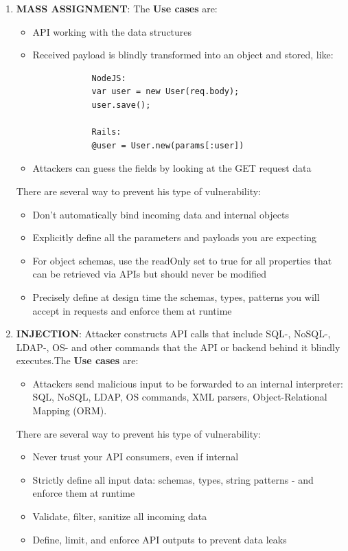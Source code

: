 \documentclass[10pt,a4paper]{report}
\begin{document}
\begin{enumerate}
\begin{itemize}
		\end{itemize}
	
	\item \textbf{MASS ASSIGNMENT}: The \textbf{Use cases} are:
	\begin{itemize}
		\item API working with the data structures
		\item Received payload is blindly transformed into an object and stored, like:
		\begin{lstlisting}
			NodeJS:
			var user = new User(req.body);
			user.save();
			
			Rails:
			@user = User.new(params[:user])
		\end{lstlisting}
		\item Attackers can guess the fields by looking at the GET request data
	\end{itemize}
	There are several way to prevent his type of vulnerability:
	\begin{itemize}
		\item Don’t automatically bind incoming data and internal objects
		\item Explicitly define all the parameters and payloads you are expecting
		\item For object schemas, use the readOnly set to true for all properties that
		can be retrieved via APIs but should never be modified
		\item Precisely define at design time the schemas, types, patterns you will
		accept in requests and enforce them at runtime
		
	\end{itemize}

		\item \textbf{INJECTION}: Attacker constructs API calls that include SQL-, NoSQL-, LDAP-, OS- and	other commands that the API or backend behind it blindly executes.The \textbf{Use cases} are:
	\begin{itemize}
		\item Attackers send malicious input to be forwarded to an internal
		interpreter: SQL, NoSQL, LDAP, OS commands, XML parsers, Object-Relational Mapping (ORM).

	\end{itemize}
	There are several way to prevent his type of vulnerability:
	\begin{itemize}
		\item Never trust your API consumers, even if internal
		\item Strictly define all input data: schemas, types, string patterns - and
		enforce them at runtime
		\item Validate, filter, sanitize all incoming data
		\item Define, limit, and enforce API outputs to prevent data leaks
		
	\end{itemize}
\end{enumerate}
\end{document}
